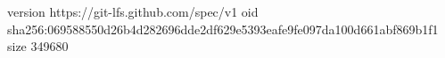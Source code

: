 version https://git-lfs.github.com/spec/v1
oid sha256:069588550d26b4d282696dde2df629e5393eafe9fe097da100d661abf869b1f1
size 349680
